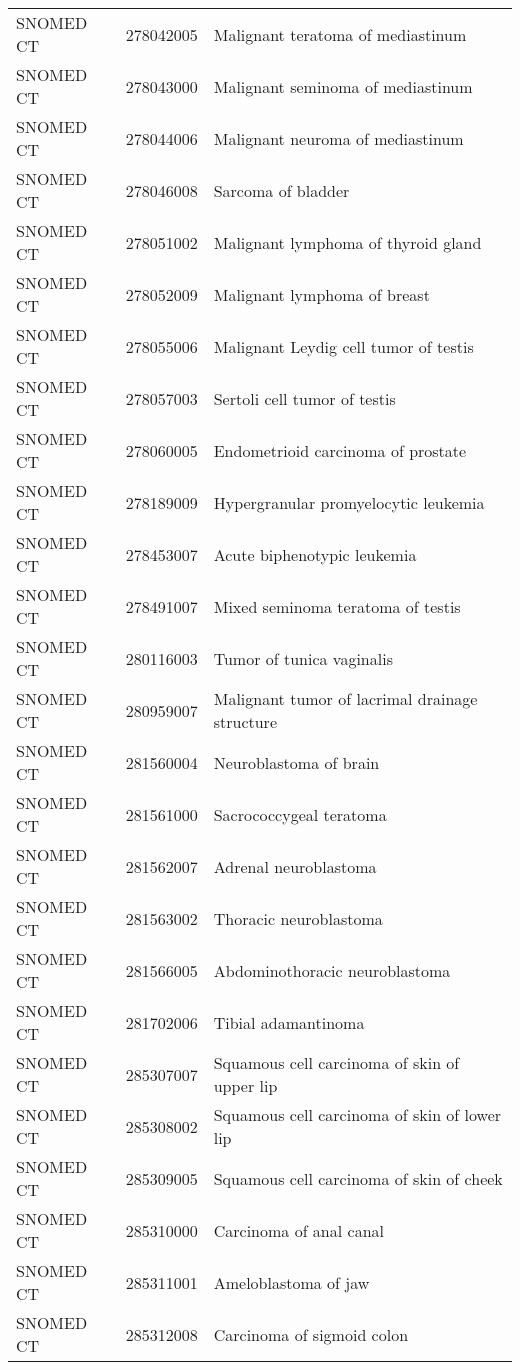 \begin{longtable}{p{}p{}p{}}
  SNOMED CT & 278042005 & Malignant teratoma of mediastinum \\ 
  SNOMED CT & 278043000 & Malignant seminoma of mediastinum \\ 
  SNOMED CT & 278044006 & Malignant neuroma of mediastinum \\ 
  SNOMED CT & 278046008 & Sarcoma of bladder \\ 
  SNOMED CT & 278051002 & Malignant lymphoma of thyroid gland \\ 
  SNOMED CT & 278052009 & Malignant lymphoma of breast \\ 
  SNOMED CT & 278055006 & Malignant Leydig cell tumor of testis \\ 
  SNOMED CT & 278057003 & Sertoli cell tumor of testis \\ 
  SNOMED CT & 278060005 & Endometrioid carcinoma of prostate \\ 
  SNOMED CT & 278189009 & Hypergranular promyelocytic leukemia \\ 
  SNOMED CT & 278453007 & Acute biphenotypic leukemia \\ 
  SNOMED CT & 278491007 & Mixed seminoma teratoma of testis \\ 
  SNOMED CT & 280116003 & Tumor of tunica vaginalis \\ 
  SNOMED CT & 280959007 & Malignant tumor of lacrimal drainage structure \\ 
  SNOMED CT & 281560004 & Neuroblastoma of brain \\ 
  SNOMED CT & 281561000 & Sacrococcygeal teratoma \\ 
  SNOMED CT & 281562007 & Adrenal neuroblastoma \\ 
  SNOMED CT & 281563002 & Thoracic neuroblastoma \\ 
  SNOMED CT & 281566005 & Abdominothoracic neuroblastoma \\ 
  SNOMED CT & 281702006 & Tibial adamantinoma \\ 
  SNOMED CT & 285307007 & Squamous cell carcinoma of skin of upper lip \\ 
  SNOMED CT & 285308002 & Squamous cell carcinoma of skin of lower lip \\ 
  SNOMED CT & 285309005 & Squamous cell carcinoma of skin of cheek \\ 
  SNOMED CT & 285310000 & Carcinoma of anal canal \\ 
  SNOMED CT & 285311001 & Ameloblastoma of jaw \\ 
  SNOMED CT & 285312008 & Carcinoma of sigmoid colon \\ 

\end{longtable}
